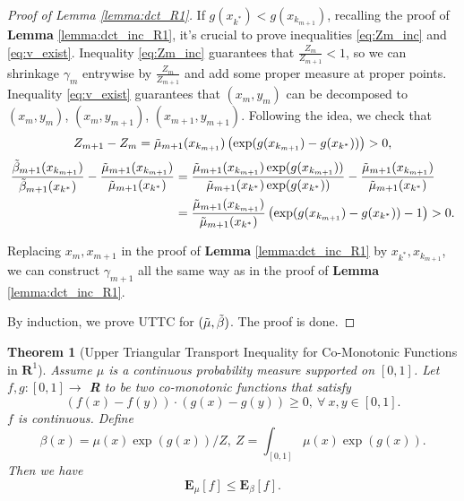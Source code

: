 \documentclass[nohyperref]{article}
\theoremstyle{plain}
\newtheorem{Theorem}{\textbf{Theorem}}
\begin{document}
\begin{proof}[Proof of Lemma \ref{lemma:dct_R1}]
If $g(x_{k^*}) < g(x_{k_{m+1}})$, recalling the proof of \textbf{Lemma} \ref{lemma:dct_inc_R1}, it's crucial to prove inequalities \eqref{eq:Zm_inc} and \eqref{eq:v_exist}.
Inequality \eqref{eq:Zm_inc} guarantees that $\frac{Z_m}{Z_{m+1}} < 1$, so we can shrinkage $\gamma_m$ entrywise by $\frac{Z_m}{Z_{m+1}}$ and add some proper measure at proper points.
Inequality \eqref{eq:v_exist} guarantees that $(x_m, y_m)$ can be decomposed to $(x_m, y_m)$, $(x_m, y_{m+1})$, $(x_{m+1}, y_{m+1})$.
Following the idea, we check that 
\begin{equation*}
    Z_{m+1} - Z_m = \Tilde{\mu}_{m+1} (x_{k_{m+1}}) \left( \exp (g(x_{k_{m+1}}) - g(x_{k^*})) \right) > 0,
\end{equation*}
\begin{equation*}
    \begin{aligned}
        \frac{\Tilde{\beta}_{m+1} (x_{k_{m+1}})}{\Tilde{\beta}_{m+1} (x_{k^*})} 
        - \frac{\Tilde{\mu}_{m+1} (x_{k_{m+1}})}{\Tilde{\mu}_{m+1} (x_{k^*})} 
        &= \frac{\Tilde{\mu}_{m+1} (x_{k_{m+1}}) \exp(g(x_{k_{m+1}}))}{\Tilde{\mu}_{m+1} (x_{k^*}) \exp (g(x_{k^*}))} 
        - \frac{\Tilde{\mu}_{m+1} (x_{k_{m+1}})}{\Tilde{\mu}_{m+1} (x_{k^*})}  \\
        &= \frac{\Tilde{\mu}_{m+1} (x_{k_{m+1}})}{\Tilde{\mu}_{m+1} (x_{k^*})}
        \left(\exp(g(x_{k_{m+1}}) - g(x_{k^*})) - 1 \right) > 0.
    \end{aligned}
\end{equation*}

Replacing $x_m, x_{m+1}$ in the proof of \textbf{Lemma} \ref{lemma:dct_inc_R1} by $x_{k^*}, x_{k_{m+1}}$, we can construct $\gamma_{m+1}$ all the same way as in the proof of \textbf{Lemma} \ref{lemma:dct_inc_R1}.

By induction, we prove UTTC for $(\Tilde{\mu}, \Tilde{\beta})$.
The proof is done.
\end{proof}

\begin{Theorem}[Upper Triangular Transport Inequality for Co-Monotonic Functions in $\mathbf{R}^1$]
Assume $\mu$ is a continuous probability measure supported on $[0, 1]$.
Let $f, g: [0, 1] \rightarrow $ \textbf{R} to be two co-monotonic functions that satisfy
$$(f(x) - f(y)) \cdot (g(x) - g(y)) \geq 0, \ \forall \ x, y \in [0, 1].$$
$f$ is continuous.
Define 
$$\beta(x) = \mu(x) \exp(g(x)) / Z, \ Z = \int_{[0, 1]} \mu(x) \exp (g(x)).$$
Then we have 
$$\textbf{E}_{\mu} [f] \leq \textbf{E}_{\beta} [f].$$
\label{thm:cts_R1}
\end{Theorem}
\end{document}
